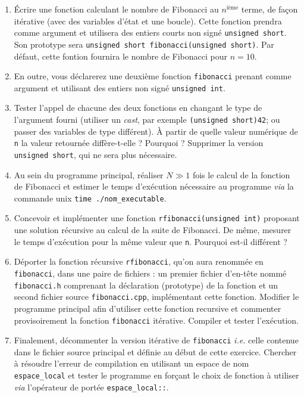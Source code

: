 \documentclass{book}
\newcommand{\inline}[1]{\texttt{#1}}
\begin{document}
\begin{enumerate}
\item Écrire une fonction calculant le nombre de Fibonacci au \(n\)\(^{\text{ième}}\) terme, de façon itérative (avec des variables d'état et une boucle). Cette fonction prendra comme argument et utilisera des entiers courts non signé \inline{unsigned short}. Son prototype sera \inline{unsigned short fibonacci(unsigned short)}. Par défaut, cette fontion fournira le nombre de Fibonacci pour \(n=10\).

\item En outre, vous déclarerez une deuxième fonction \inline{fibonacci} prenant comme argument et utilisant des
entiers non signé \inline{unsigned int}.

\item Tester l'appel de chacune des deux fonctions en changant le type de l'argument fourni (utiliser un \textit{cast}, par exemple \inline{(unsigned short)42}; ou passer des variables de type différent). À partir de quelle valeur numérique de \texttt{n} la valeur retournée diffère-t-elle ? Pourquoi ? Supprimer la version \inline{unsigned short}, qui ne sera plus nécessaire.

\item Au sein du programme principal, réaliser \(N\gg1\) fois le calcul de la fonction
de Fibonacci et estimer le temps d'exécution nécessaire au programme \emph{via} la
commande unix \texttt{time ./nom\_executable}.

\item Concevoir et implémenter une fonction \inline{rfibonacci(unsigned int)} proposant une solution récursive au calcul de la suite de Fibonacci. De même, mesurer le temps d'exécution pour la même valeur que \texttt{n}. Pourquoi est-il différent ?
  
\item Déporter la fonction récursive \texttt{rfibonacci}, qu'on aura renommée en \texttt{fibonacci}, dans une paire de fichiers : un premier fichier d'en-tête nommé \texttt{fibonacci.h} comprenant la déclaration (prototype) de la fonction et un second fichier source \texttt{fibonacci.cpp}, implémentant cette fonction. Modifier le programme principal afin d'utiliser cette fonction recursive et commenter provisoirement la fonction \texttt{fibonacci} itérative. Compiler et tester l'exécution.

\item Finalement, décommenter la version itérative de \texttt{fibonacci} \emph{i.e.} celle contenue dans le fichier source principal et définie au début de cette exercice. Chercher à résoudre l'erreur de compilation en utilisant un espace de nom \inline{espace_local} et tester le programme en forçant le choix de fonction à utiliser \emph{via} l'opérateur de portée \inline{espace_local::}.
\end{enumerate}
\end{document}
